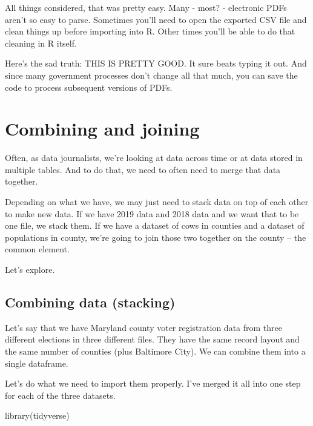 \documentclass[
  letterpaper,
  DIV=11,
  numbers=noendperiod]{scrreprt}
\newenvironment{Shaded}{\begin{snugshade}}{\end{snugshade}}
\newcommand{\FunctionTok}[1]{\textcolor[rgb]{0.28,0.35,0.67}{#1}}
\newcommand{\NormalTok}[1]{\textcolor[rgb]{0.00,0.23,0.31}{#1}}
\begin{document}
All things considered, that was pretty easy. Many - most? - electronic
PDFs aren't so easy to parse. Sometimes you'll need to open the exported
CSV file and clean things up before importing into R. Other times you'll
be able to do that cleaning in R itself.

Here's the sad truth: THIS IS PRETTY GOOD. It sure beats typing it out.
And since many government processes don't change all that much, you can
save the code to process subsequent versions of PDFs.


\hypertarget{combining-and-joining}{%
\chapter{Combining and joining}\label{combining-and-joining}}

Often, as data journalists, we're looking at data across time or at data
stored in multiple tables. And to do that, we need to often need to
merge that data together.

Depending on what we have, we may just need to stack data on top of each
other to make new data. If we have 2019 data and 2018 data and we want
that to be one file, we stack them. If we have a dataset of cows in
counties and a dataset of populations in county, we're going to join
those two together on the county -- the common element.

Let's explore.

\hypertarget{combining-data-stacking}{%
\section{Combining data (stacking)}\label{combining-data-stacking}}

Let's say that we have Maryland county voter registration data from
three different elections in three different files. They have the same
record layout and the same number of counties (plus Baltimore City). We
can combine them into a single dataframe.

Let's do what we need to import them properly. I've merged it all into
one step for each of the three datasets.

\begin{Shaded}
\begin{Highlighting}[]
\FunctionTok{library}\NormalTok{(tidyverse)}
\end{Highlighting}
\end{Shaded}
\end{document}
